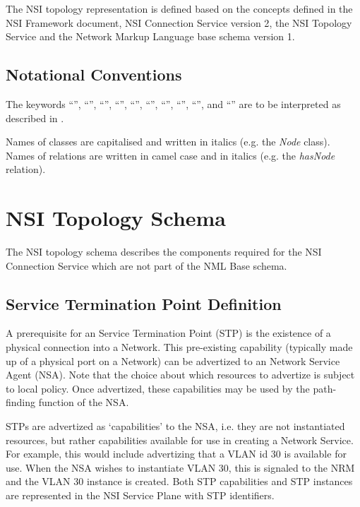 \documentclass[12pt]{article}  %
\begin{document}
The NSI topology representation is defined based on the concepts defined in the NSI Framework document\cite{nsi-fw}, NSI Connection Service version 2\cite{nsiv2}, the NSI Topology Service\cite{nsi-ts} and the Network Markup Language base schema version 1\cite{nml}.

\subsection{Notational Conventions}%
\label{sec:rfc2119}

The keywords “\MUST{}”, “\MUSTNOT{}”, “\REQUIRED{}”, “\SHALL{}”, “\SHALLNOT{}”, 
“\SHOULD{}”, “\SHOULDNOT{}”, “\RECOMMENDED{}”, “\MAY{}”,  and “\OPTIONAL{}” are 
to be interpreted as described in \cite{rfc2119}.

Names of classes are capitalised and written in italics (e.g. the \emph{Node} class).
Names of relations are written in camel case and in italics (e.g. the \emph{hasNode} relation).




\section{NSI Topology Schema}\label{sec:syntax}

The NSI topology schema describes the components required for the NSI Connection Service which are not part of the NML Base schema. 

\subsection{Service Termination Point Definition} %
\label{sub:service_termination_point_definition}

A prerequisite for an Service Termination Point (STP) is the existence of a physical connection into a Network. This pre-existing capability (typically made up of a physical port on a Network) can be advertized to an Network Service Agent (NSA). Note that the choice about which resources to advertize is subject to local policy. Once advertized, these capabilities may be used by the path-finding function of the NSA.

STPs are advertized as `capabilities' to the NSA, i.e. they are not instantiated resources, but rather capabilities available for use in creating a Network Service. For example, this would include advertizing that a VLAN id 30 is available for use. When the NSA wishes to instantiate VLAN 30, this is signaled to the NRM and the VLAN 30 instance is created. Both STP capabilities and STP instances are represented in the NSI Service Plane with STP identifiers.
\end{document}
